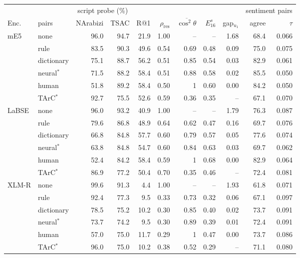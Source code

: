 \begin{tabular}{@{}llrrrrrrrrr@{}}
\toprule
 & & \multicolumn{2}{c}{script probe (\%)} & & & & & & \multicolumn{2}{c}{sentiment pairs}\\
\cmidrule(lr){3-4}\cmidrule(l){10-11}
Enc. & pairs & NArabizi & TSAC & R@1 & $\rho_{\mathrm{res}}$ & $\overline{\cos^2\theta}$ & $E^{s}_{16}$ & gap$_{u_1}$ & agree & $\tau$\\
\midrule
mE5 & none & 96.0 & 94.7 & 21.9 & 1.00 & -- & -- & 1.68 & 68.4 & 0.066 \\
 & rule & 83.5 & 90.3 & 49.6 & 0.54 & 0.69 & 0.48 & 0.09 & 75.0 & 0.075 \\
 & dictionary & 75.1 & 88.7 & 56.2 & 0.51 & 0.85 & 0.54 & 0.03 & 82.9 & 0.061 \\
 & neural$^{\ast}$ & 71.5 & 88.2 & 58.4 & 0.51 & 0.88 & 0.58 & 0.02 & 85.5 & 0.050 \\
 & human & 51.8 & 89.2 & 58.4 & 0.50 & 1 & 0.60 & 0.00 & 84.2 & 0.050 \\
 & TArC$^{\ast}$ & 92.7 & 75.5 & 52.6 & 0.59 & 0.36 & 0.35 & -- & 67.1 & 0.070 \\
\addlinespace
LaBSE & none & 96.0 & 93.2 & 40.9 & 1.00 & -- & -- & 1.79 & 76.3 & 0.087 \\
 & rule & 79.6 & 86.8 & 48.9 & 0.64 & 0.62 & 0.47 & 0.16 & 69.7 & 0.076 \\
 & dictionary & 66.8 & 84.8 & 57.7 & 0.60 & 0.79 & 0.57 & 0.05 & 77.6 & 0.074 \\
 & neural$^{\ast}$ & 63.8 & 84.8 & 54.7 & 0.60 & 0.84 & 0.63 & 0.03 & 69.7 & 0.062 \\
 & human & 52.4 & 84.2 & 58.4 & 0.59 & 1 & 0.68 & 0.00 & 82.9 & 0.064 \\
 & TArC$^{\ast}$ & 86.9 & 77.2 & 50.4 & 0.70 & 0.35 & 0.46 & -- & 72.4 & 0.081 \\
\addlinespace
XLM-R & none & 99.6 & 91.3 & 4.4 & 1.00 & -- & -- & 1.93 & 61.8 & 0.071 \\
 & rule & 92.4 & 77.3 & 9.5 & 0.33 & 0.73 & 0.32 & 0.06 & 67.1 & 0.097 \\
 & dictionary & 78.5 & 75.2 & 10.2 & 0.30 & 0.85 & 0.40 & 0.02 & 73.7 & 0.091 \\
 & neural$^{\ast}$ & 73.7 & 74.2 & 9.5 & 0.30 & 0.89 & 0.39 & 0.01 & 72.4 & 0.091 \\
 & human & 57.0 & 75.0 & 11.7 & 0.29 & 1 & 0.47 & 0.00 & 73.7 & 0.086 \\
 & TArC$^{\ast}$ & 96.0 & 75.0 & 10.2 & 0.38 & 0.52 & 0.29 & -- & 71.1 & 0.080 \\
\bottomrule
\end{tabular}
